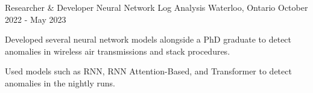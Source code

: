 
\begin{cventries}
  \cventry
    {Researcher \& Developer} %
    {Neural Network Log Analysis} %
    {Waterloo, Ontario} %
    {October 2022 - May 2023} %
    {
      \begin{cvitems} %
        \item {Developed several neural network models alongside a PhD graduate to detect anomalies in wireless air transmissions and stack procedures.}
        \item {Used models such as RNN, RNN Attention-Based, and Transformer to detect anomalies in the nightly runs.}
      \end{cvitems}
    }




\end{cventries}
